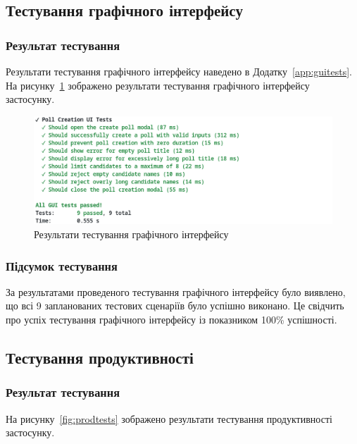 \documentclass[14pt]{extreport}
\begin{document}
  \subsection{Тестування графічного інтерфейсу}
  
  \subsubsection*{Результат тестування}
  
  Результати тестування графічного інтерфейсу наведено в Додатку~\ref{app:guitests}. На рисунку~\ref{fig:guitests} зображено результати тестування графічного інтерфейсу застосунку.

  \begin{figure}[H]
    \centering
    \includegraphics[scale=0.4]{GuiTests}
    \caption{Результати тестування графічного інтерфейсу}
    \label{fig:guitests}
  \end{figure}
  
  \subsubsection*{Підсумок тестування}
  
  За результатами проведеного тестування графічного інтерфейсу було виявлено, що всі 9 запланованих тестових сценаріїв було успішно виконано. Це свідчить про успіх тестування графічного інтерфейсу із показником 100\% успішності.
  
  \subsection{Тестування продуктивності}
  
  \subsubsection*{Результат тестування}
  
  На рисунку~\ref{fig:prodtests} зображено результати тестування продуктивності застосунку.
\end{document}
